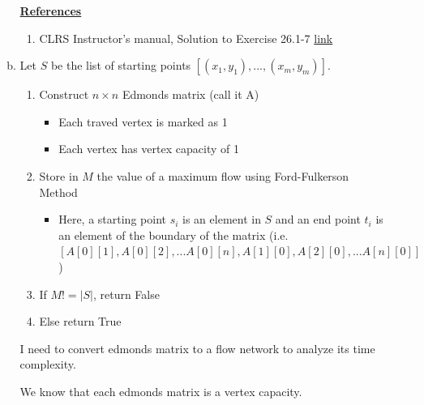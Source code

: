 \documentclass[12pt]{article}
\begin{document}
\begin{enumerate}[1.]
\begin{enumerate}[a)]
        \bigskip

        \underline{\textbf{References}}

        \bigskip

        \begin{enumerate}[1)]
            \item CLRS Instructor's manual, Solution to Exercise 26.1-7 \href{https://cdn.manesht.ir/19908___Introduction%20to%20Algorithms.pdf}{link}
        \end{enumerate}

        \item

        Let $S$ be the list of starting points $[(x_1, y_1), ..., (x_m, y_m)]$.

        \bigskip

        \begin{enumerate}[1)]
            \item Construct $n \times n$ Edmonds matrix (call it A)

            \begin{itemize}
                \item Each traved vertex is marked as 1
                \item Each vertex has vertex capacity of 1
            \end{itemize}
            \item Store in $M$ the value of a maximum flow using Ford-Fulkerson Method

            \begin{itemize}
                \item Here, a starting point $s_i$ is an element in $S$ and an end point $t_i$ is an element of the boundary of the matrix
                (i.e. $[A[0][1], A[0][2], ... A[0][n], A[1][0], A[2][0], ... A[n][0]]$)
            \end{itemize}
            \item If $M != \lvert S \rvert$, return False
            \item Else return True

        \end{enumerate}

        \bigskip

        I need to convert edmonds matrix to a flow network to analyze its time complexity.

        \bigskip

        We know that each edmonds matrix is a vertex capacity.


\end{enumerate}
\end{enumerate}
\end{document}
